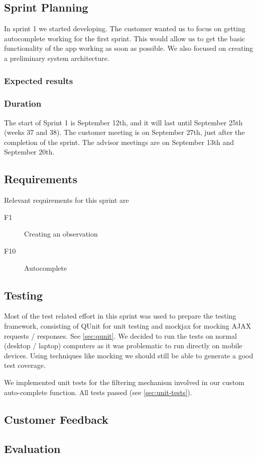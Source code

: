\subsection{Sprint Planning}

	In sprint 1 we started developing. The customer wanted us to focus on getting autocomplete working for the first sprint. This would allow us to get the basic functionality of the app working as soon as possible. We also focused on creating a preliminary system architecture.

	\subsubsection{Expected results}
	
	\subsubsection{Duration}
	The start of Sprint 1 is September 12th, and it will last until September 25th (weeks 37 and 38). The customer meeting is on September 27th, just after the completion of the sprint. The advisor meetings are on September 13th and September 20th.
	
\subsection{Requirements}

	Relevant requirements for this sprint are 
  \begin{description}
  \item[F1] Creating an observation
  \item[F10] Autocomplete 
  \end{description}


\subsection{Testing}

	Most of the test related effort in this sprint was used to prepare the
	testing framework, consisting of QUnit for unit testing and mockjax for
	mocking AJAX requests / responses. See \ref{sec:qunit}. We decided to run
	the tests on normal (desktop / laptop) computers as it was problematic to
	run directly on mobile devices. Using techniques like mocking we should
	still be able to generate a good test coverage.

	We implemented unit tests for the filtering mechanism involved in our custom
	auto-complete function. All tests passed (see \ref{sec:unit-tests}).

\subsection{Customer Feedback}

\subsection{Evaluation}

